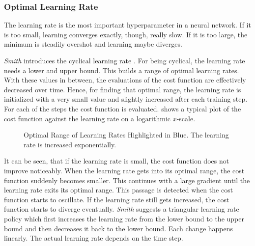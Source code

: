 \subsubsection{Optimal Learning Rate}
\label{sec:improving-performance-learning-rate}
The learning rate is the most important hyperparameter in a neural network.
If it is too small, learning converges exactly, though, really slow.
If it is too large, the minimum is steadily overshot and learning maybe diverges.

\textit{Smith} introduces the cyclical learning rate \cite{DBLP:journals/corr/Smith15a}.
For being cyclical, the learning rate needs a lower and upper bound.
This builds a range of optimal learning rates.
With these values in between, the evaluations of the cost function are effectively decreased over time.
Hence, for finding that optimal range, the learning rate is initialized with a very small value and slightly increased after each training step.
For each of the steps the cost function is evaluated.
 shows a typical plot of the cost function against the learning rate on a logarithmic $x$-scale.
\begin{figure}
	\setlength{}
	\setlength{}
	\centering
	
	\caption[Optimal Range of Learning Rates]{Optimal Range of Learning Rates Highlighted in Blue. The learning rate is increased exponentially.}
	\label{fig:optimal-learning-rate-range}
\end{figure}
It can be seen, that if the learning rate is small, the cost function does not improve noticeably.
When the learning rate gets into its optimal range, the cost function suddenly becomes smaller.
This continues with a large gradient until the learning rate exits its optimal range.
This passage is detected when the cost function starts to oscillate.
If the learning rate still gets increased, the cost function starts to diverge eventually.
\textit{Smith} suggests a triangular learning rate policy which first increases the learning rate from the lower bound to the upper bound and then decreases it back to the lower bound.
Each change happens linearly.
The actual learning rate depends on the time step.

